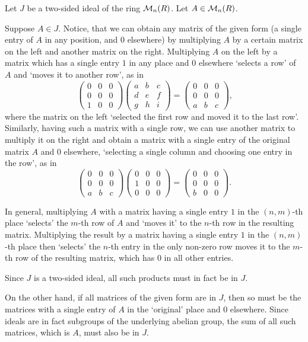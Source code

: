 \begin{solution}
	Let $J$ be a two-sided ideal of the ring $\mathcal{M}_n(R)$. Let $A \in \mathcal{M}_n(R)$.
	
	Suppose $A \in J$. Notice, that we can obtain any matrix of the given form (a single entry of $A$ in any position, and $0$ elsewhere) by multiplying $A$ by a certain matrix on the left and another matrix on the right. Multiplying $A$ on the left by a matrix which has a single entry $1$ in any place and $0$ elsewhere `selects a row' of $A$ and `moves it to another row', as in
	\[
		\begin{pmatrix}
			0 & 0 & 0 \\
			0 & 0 & 0 \\
			1 & 0 & 0
		\end{pmatrix}
		\begin{pmatrix}
			a & b & c \\
			d & e & f \\
			g & h & i
		\end{pmatrix}
		= \begin{pmatrix}
			0 & 0 & 0 \\
			0 & 0 & 0 \\
			a & b & c
		\end{pmatrix} \text{,}
	\]
	where the matrix on the left `selected the first row and moved it to the last row'. Similarly, having such a matrix with a single row, we can use another matrix to multiply it on the right and obtain a matrix with a single entry of the original matrix $A$ and $0$ elsewhere, `selecting a single column and choosing one entry in the row', as in
	\[
		\begin{pmatrix}
			0 & 0 & 0 \\
			0 & 0 & 0 \\
			a & b & c
		\end{pmatrix}
		\begin{pmatrix}
			0 & 0 & 0 \\
			1 & 0 & 0 \\
			0 & 0 & 0 
		\end{pmatrix}
		= \begin{pmatrix}
			0 & 0 & 0 \\
			0 & 0 & 0 \\
			b & 0 & 0
		\end{pmatrix} \text{.}
	\]
	
	In general, multiplying $A$ with a matrix having a single entry $1$ in the $(n, m)$-th place `selects' the $m$-th row of $A$ and `moves it' to the $n$-th row in the resulting matrix. Multiplying the result by a matrix having a single entry $1$ in the $(n, m)$-th place then `selects' the $n$-th entry in the only non-zero row moves it to the $m$-th row of the resulting matrix, which has $0$ in all other entries.
	
	Since $J$ is a two-sided ideal, all such products must in fact be in $J$.
	
	On the other hand, if all matrices of the given form are in $J$, then so must be the matrices with a single entry of $A$ in the `original' place and $0$ elsewhere. Since ideals are in fact subgroups of the underlying abelian group, the sum of all such matrices, which is $A$, must also be in $J$.
\end{solution}

